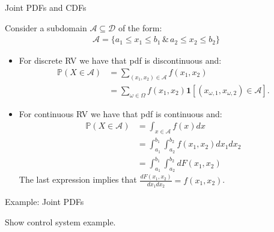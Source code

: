 \documentclass[9pt]{beamer}
\begin{document}
%
\begin{frame}{Joint PDFs and CDFs}

Consider a subdomain $\mathcal{A}\subseteq\mathcal{D}$ of the form:
\begin{align*}
\mathcal{A}=\{a_1 \leq x_1\leq b_1 \, \&\, a_2 \leq x_2\leq b_2\}
\end{align*}

\begin{itemize}

\item For discrete RV we have that pdf is discontinuous and:
\begin{align*}
\mathbb{P}(X\in \mathcal{A})&=\sum_{(x_1,x_2)\in \mathcal{A}}f(x_1,x_2)\\
&=\sum_{\omega \in \Omega}f(x_1,x_2)\mathbf{1}[(x_{\omega,1},x_{\omega,2})\in \mathcal{A}].
\end{align*}

\item For continuous RV we have that pdf is continuous and:
\begin{align*}
\mathbb{P}(X\in \mathcal{A})&=\int_{x\in \mathcal{A}}f(x)dx\\
&=\int_{a_1}^{b_1}\int_{a_2}^{b_2}f(x_1,x_2)dx_1dx_2\\
&=\int_{a_1}^{b_1}\int_{a_2}^{b_2}dF(x_1,x_2)
\end{align*}
The last expression implies that $\frac{dF(x_1,x_2)}{dx_1dx_2}=f(x_1,x_2)$.

\end{itemize}

\end{frame}


%
\begin{frame}{Example: Joint PDFs}

\begin{block}{}
{\color{red} Show control system example.}
\end{block}

\end{frame}
\end{document}
